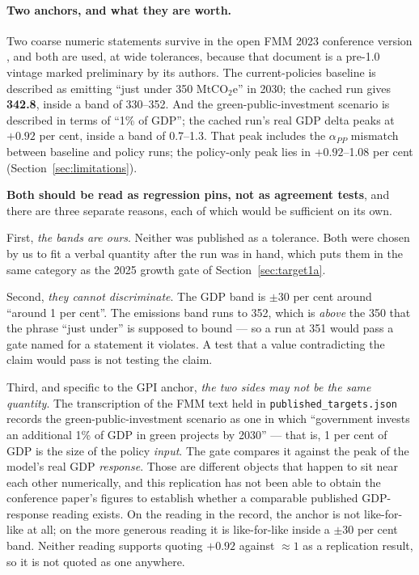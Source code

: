 \paragraph{Two anchors, and what they are worth.} Two coarse numeric statements survive in the open FMM 2023 conference version \citep{georgedafermos2023fmm}, and both are used, at wide tolerances, because that document is a pre-1.0 vintage marked preliminary by its authors. The current-policies baseline is described as emitting ``just under 350 MtCO$_2$e'' in 2030; the cached run gives \textbf{342.8}, inside a band of 330--352. And the green-public-investment scenario is described in terms of ``1\% of GDP''; the cached run's real GDP delta peaks at \textbf{$+0.92$} per cent, inside a band of 0.7--1.3. That peak includes the $\alpha_{PP}$ mismatch between baseline and policy runs; the policy-only peak lies in $+0.92$--1.08 per cent (Section~\ref{sec:limitations}).

\textbf{Both should be read as regression pins, not as agreement tests}, and there are three separate reasons, each of which would be sufficient on its own.

First, \emph{the bands are ours}. Neither was published as a tolerance. Both were chosen by us to fit a verbal quantity after the run was in hand, which puts them in the same category as the 2025 growth gate of Section~\ref{sec:target1a}.

Second, \emph{they cannot discriminate}. The GDP band is $\pm30$ per cent around ``around 1 per cent''. The emissions band runs to 352, which is \emph{above} the 350 that the phrase ``just under'' is supposed to bound --- so a run at 351 would pass a gate named for a statement it violates. A test that a value contradicting the claim would pass is not testing the claim.

Third, and specific to the GPI anchor, \emph{the two sides may not be the same quantity}. The transcription of the FMM text held in \texttt{published\_targets.json} records the green-public-investment scenario as one in which ``government invests an additional 1\% of GDP in green projects by 2030'' --- that is, 1 per cent of GDP is the size of the policy \emph{input}. The gate compares it against the peak of the model's real GDP \emph{response}. Those are different objects that happen to sit near each other numerically, and this replication has not been able to obtain the conference paper's figures to establish whether a comparable published GDP-response reading exists. On the reading in the record, the anchor is not like-for-like at all; on the more generous reading it is like-for-like inside a $\pm30$ per cent band. Neither reading supports quoting $+0.92$ against $\approx1$ as a replication result, so it is not quoted as one anywhere.

